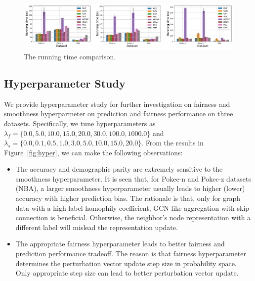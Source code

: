 \documentclass[letterpaper]{article} %
\theoremstyle{plain}
\theoremstyle{definition}
\theoremstyle{remark}
\begin{document}
\begin{figure}[t]
\centering
\includegraphics[width=0.99\linewidth]{runtime_all.pdf}

\caption{The running time comparison.}
\label{fig:runtime}
\vspace{-5pt}
\end{figure}

\subsection{Hyperparameter Study} \label{app:hyper}
We provide hyperparameter study for further investigation on fairness and smoothness hyperparmeter on prediction and fairness performance on three datasets. Specifically, we tune hyperparameters as $\lambda_f=\{0.0, 5.0, 10.0, 15.0, 20.0, 30.0, 100.0, 1000.0\}$ and $\lambda_s=\{0.0, 0.1, 0.5, 1.0, 3.0, 5.0, 10.0, 15.0, 20.0\}$. From the results in Figure~\ref{fig:hyper}, we can make the following observations:
\begin{itemize}
    \item The accuracy and demographic parity are extremely sensitive to the smoothness hyperparameter. It is seen that, for Pokec-n and Pokec-z datasets (NBA), a larger smoothness hyperparameter usually leads to higher (lower) accuracy with higher prediction bias. The rationale is that, only for graph data with a high label homophily coefficient, GCN-like aggregation with skip connection is beneficial. Otherwise, the neighbor's node representation with a different label will mislead the representation update.
    \item The appropriate fairness hyperparameter leads to better fairness and prediction performance tradeoff. The reason is that fairness hyperparameter determines the perturbation vector update step size in probability space. Only appropriate step size can lead to better perturbation vector update.
\end{itemize}
\end{document}
